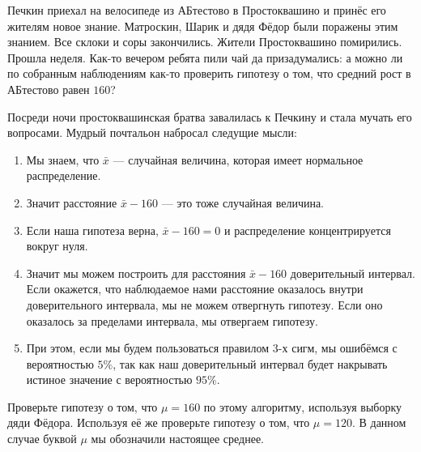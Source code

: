\documentclass[12pt, a4paper, oneside]{article}
\begin{document}
Печкин приехал на велосипеде из АБтестово в Простоквашино и принёс его жителям новое знание. Матроскин, Шарик и дядя Фёдор были поражены этим знанием. Все склоки и соры закончились. Жители Простоквашино помирились. Прошла неделя. Как-то вечером ребята пили чай да призадумались: а можно ли по собранным наблюдениям как-то проверить гипотезу о том, что средний рост в АБтестово равен $160$? 

Посреди ночи простоквашинская братва завалилась к Печкину и стала мучать его вопросами. Мудрый почтальон набросал следущие мысли: 

\begin{enumerate} 
	\item  Мы знаем, что $\bar x $ --- случайная величина, которая имеет нормальное распределение.
	
	\item Значит расстояние  $\bar x - 160$ --- это тоже случайная величина.
	
	\item Если наша гипотеза верна, $\bar x - 160 = 0$  и распределение концентрируется вокруг нуля. 
	
	\item Значит мы можем построить для расстояния $\bar x - 160$ доверительный интервал. Если окажется,  что наблюдаемое нами расстояние оказалось внутри доверительного интервала, мы не можем отвергнуть гипотезу. Если оно оказалось за пределами интервала, мы отвергаем гипотезу. 
	
	\item При этом, если мы будем пользоваться правилом $3$-х сигм, мы ошибёмся с вероятностью $5\%$, так как наш доверительный интервал будет накрывать истиное значение с вероятностью $95\%$. 
\end{enumerate}

Проверьте гипотезу о том, что $\mu = 160$ по этому алгоритму, используя выборку дяди Фёдора. Используя её же проверьте гипотезу о том, что  $\mu = 120$. В данном случае буквой $\mu$ мы обозначили настоящее среднее. 
\end{document}

